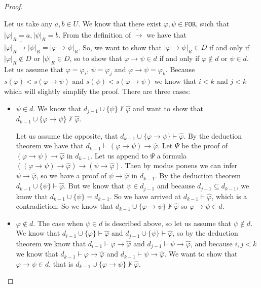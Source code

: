 \documentclass{article}
\theoremstyle{definition}
\theoremstyle{definition}
\theoremstyle{definition}
\theoremstyle{definition}
\theoremstyle{definition}
\newcommand*{\ra}{\rightarrow}
\newcommand*{\FOR}{\texttt{FOR}}
\begin{document}
\begin{proof}
\begin{itemize}
              Let us take any $a, b \in U$. We know that there exist $\varphi, \psi \in
                  \FOR$, such that $|\varphi|_R = a, |\psi|_R = b$. From the definition of
              $\tilde{\ra}$ we have that $|\varphi|_R \tilde{\ra} |\psi|_R = |\varphi \ra
                  \psi|_R$. So, we want to show that $|\varphi \ra \psi|_R \in D$ if and only if
              $|\varphi|_R \not \in D$ or $|\psi|_R \in D$, so to show that $\varphi \ra \psi
                  \in d$ if and only if $\varphi \not \in d$ or $\psi \in d$. Let us assume that
              $\varphi = \varphi_i$, $\psi = \varphi_j$ and $\varphi \ra \psi = \varphi_k$.
              Because $s(\varphi) < s(\varphi \ra \psi)$ and $s(\psi) < s(\varphi \ra \psi)$
              we know that $i < k$ and $j < k$ which will slightly simplify the proof. There
              are three cases:
              \begin{itemize}
                  \item $\psi \in d$. We know that $d_{j-1} \cup \{\psi\} \not \vdash \hat{\varphi}$ and want to show that $d_{k-1} \cup \{\varphi \ra \psi\} \not \vdash \hat{\varphi}$.

                        Let us assume the opposite, that $d_{k-1} \cup \{\varphi \ra \psi\} \vdash
                            \hat{\varphi}$. By the deduction theorem we have that $d_{k-1} \vdash (\varphi
                            \ra \psi) \ra \hat{\varphi}$. Let $\Psi$ be the proof of $(\varphi \ra \psi)
                            \ra \hat{\varphi}$ in $d_{k-1}$. Let us append to $\Psi$ a formula $((\varphi
                            \ra \psi) \ra \hat{\varphi}) \ra (\psi \ra \hat{\varphi})$. Then by modus
                        ponens we can infer $\psi \ra \hat{\varphi}$, so we have a proof of $\psi \ra
                            \hat{\varphi}$ in $d_{k-1}$. By the deduction theorem $d_{k-1} \cup \{\psi\}
                            \vdash \hat{\varphi}$. But we know that $\psi \in d_{j-1}$ and because $d_{j-1}
                            \subseteq d_{k-1}$, we know that $d_{k-1} \cup \{\psi\} = d_{k-1}$. So we have
                        arrived at $d_{k-1} \vdash \hat{\varphi}$, which is a contradiction. So we know
                        that $d_{k-1} \cup \{\varphi \ra \psi\} \not \vdash \hat{\varphi}$ so $\varphi
                            \ra \psi \in d$.

                  \item $\varphi \not \in d$. The case when $\psi \in d$ is described above, so let us assume that $\psi \not \in d$. We know that $d_{i-1} \cup \{\varphi\} \vdash \hat{\varphi}$ and $d_{j-1} \cup \{\psi\} \vdash \hat{\varphi}$, so by the deduction theorem we know that $d_{i-1} \vdash \varphi \ra \hat{\varphi}$ and $d_{j-1} \vdash \psi \ra \hat{\varphi}$, and because $i, j < k$ we know that $d_{k-1} \vdash \varphi \ra \hat{\varphi}$ and $d_{k-1} \vdash \psi \ra \hat{\varphi}$. We want to show that $\varphi \ra \psi \in d$, that is $d_{k-1} \cup \{\varphi \ra \psi\} \not \vdash \hat{\varphi}$.


\end{itemize}
\end{itemize}
\end{proof}
\end{document}
